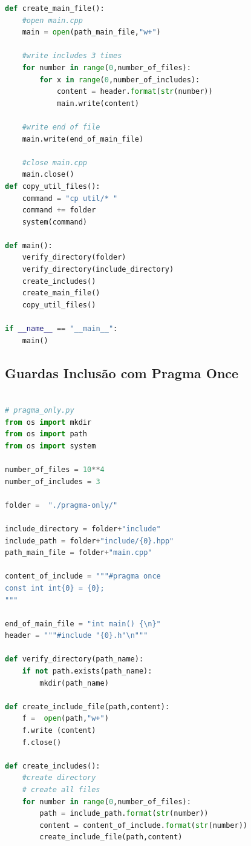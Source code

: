 \begin{apendicesenv}
\begin{lstlisting}[language=Python, caption={
    Script \textit{Pragma Once} primeiro que Guardas de Inclusão Interna},label=script_pragma_guards_include]
def create_main_file():
    #open main.cpp
    main = open(path_main_file,"w+")

    #write includes 3 times
    for number in range(0,number_of_files):
        for x in range(0,number_of_includes):
            content = header.format(str(number))
            main.write(content)

    #write end of file
    main.write(end_of_main_file)

    #close main.cpp
    main.close()
def copy_util_files():                                                           
    command = "cp util/* "                                                       
    command += folder                                                            
    system(command)                                                              

def main():
    verify_directory(folder)
    verify_directory(include_directory)
    create_includes()
    create_main_file()
    copy_util_files()

if __name__ == "__main__":
    main()
\end{lstlisting}

\subsection{Guardas Inclusão com Pragma Once}
\begin{lstlisting}[language=Python, caption={
                     Script Pragma Once},
             label=script_pragma_once_include]
             
# pragma_only.py
from os import mkdir
from os import path
from os import system

number_of_files = 10**4
number_of_includes = 3

folder =  "./pragma-only/"

include_directory = folder+"include"
include_path = folder+"include/{0}.hpp"
path_main_file = folder+"main.cpp"

content_of_include = """#pragma once
const int int{0} = {0};
"""

end_of_main_file = "int main() {\n}"
header = """#include "{0}.h"\n"""

def verify_directory(path_name):
    if not path.exists(path_name):
        mkdir(path_name)

def create_include_file(path,content):
    f =  open(path,"w+")
    f.write (content)
    f.close()

def create_includes():
    #create directory
    # create all files
    for number in range(0,number_of_files):
        path = include_path.format(str(number))
        content = content_of_include.format(str(number))
        create_include_file(path,content)
    

\end{lstlisting}
\end{apendicesenv}
